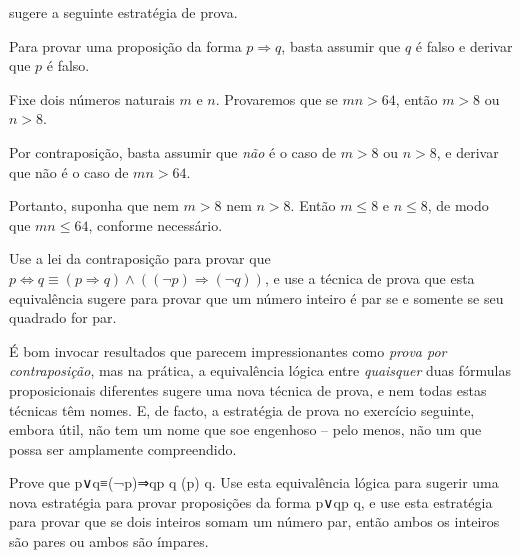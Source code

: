  sugere a seguinte estratégia de prova.

\begin{strategy}
\label{strProofByContraposition}
Para provar uma proposição da forma $p \Rightarrow q$, basta assumir que $q$ é falso e derivar que $p$ é falso.
\end{strategy}

\begin{example}
Fixe dois números naturais $m$ e $n$. Provaremos que se $mn > 64$, então $m>8$ ou $n>8$.

Por contraposição, basta assumir que \textit{não} é o caso de $m > 8$ ou $n > 8$, e derivar que não é o caso de $mn > 64$.

Portanto, suponha que nem $m>8$ nem $n>8$. Então $m \le 8$ e $n \le 8$, de modo que $mn \le 64$, conforme necessário.
\end{example}

\begin{exercise}
Use a lei da contraposição para provar que $p \Leftrightarrow q \equiv (p \Rightarrow q) \wedge ((\neg p) \Rightarrow (\neg q))$, e use a técnica de prova que esta equivalência sugere para provar que um número inteiro é par se e somente se seu quadrado for par.
\end{exercise}

É bom invocar resultados que parecem impressionantes como \textit{prova por contraposição}, mas na prática, a equivalência lógica entre \textit{quaisquer} duas fórmulas proposicionais diferentes sugere uma nova técnica de prova, e nem todas estas técnicas têm nomes. E, de facto, a estratégia de prova no exercício seguinte, embora útil, não tem um nome que soe engenhoso – pelo menos, não um que possa ser amplamente compreendido.

\begin{exercise}
Prove que p∨q≡(¬p)⇒qp \vee q \equiv (\neg p) \Rightarrow q. Use esta equivalência lógica para sugerir uma nova estratégia para provar proposições da forma p∨qp \vee q, e use esta estratégia para provar que se dois inteiros somam um número par, então ambos os inteiros são pares ou ambos são ímpares.
\end{exercise}

